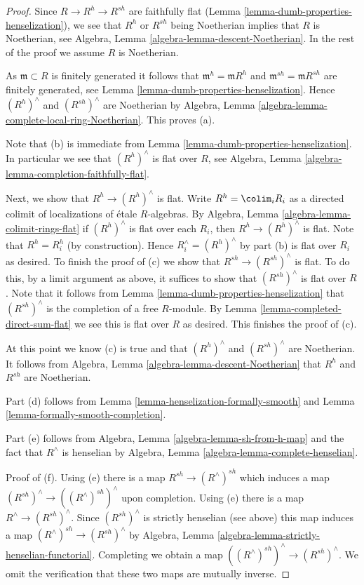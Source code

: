 \begin{proof}
Since $R \to R^h \to R^{sh}$ are faithfully flat
(Lemma \ref{lemma-dumb-properties-henselization}),
we see that $R^h$ or $R^{sh}$ being Noetherian implies that $R$
is Noetherian, see Algebra, Lemma \ref{algebra-lemma-descent-Noetherian}.
In the rest of the proof we assume $R$ is Noetherian.

\medskip\noindent
As $\mathfrak m \subset R$ is finitely generated it follows that
$\mathfrak m^h = \mathfrak m R^h$ and $\mathfrak m^{sh} = \mathfrak mR^{sh}$
are finitely generated, see Lemma \ref{lemma-dumb-properties-henselization}.
Hence $(R^h)^\wedge$ and $(R^{sh})^\wedge$ are Noetherian by
Algebra, Lemma \ref{algebra-lemma-complete-local-ring-Noetherian}.
This proves (a).

\medskip\noindent
Note that (b) is immediate from
Lemma \ref{lemma-dumb-properties-henselization}.
In particular we see that $(R^h)^\wedge$ is flat over $R$, see
Algebra, Lemma \ref{algebra-lemma-completion-faithfully-flat}.

\medskip\noindent
Next, we show that $R^h \to (R^h)^\wedge$ is flat.
Write $R^h = \colim_i R_i$ as a directed colimit of
localizations of \'etale $R$-algebras. By
Algebra, Lemma \ref{algebra-lemma-colimit-rings-flat}
if $(R^h)^\wedge$ is flat over each $R_i$, then $R^h \to (R^h)^\wedge$ is
flat. Note that $R^h = R_i^h$ (by construction).
Hence $R_i^\wedge = (R^h)^\wedge$
by part (b) is flat over $R_i$ as desired. To finish the proof of (c)
we show that $R^{sh} \to (R^{sh})^\wedge$ is flat. To do this, by a
limit argument as above, it suffices to show that $(R^{sh})^\wedge$
is flat over $R$. Note that it follows from
Lemma \ref{lemma-dumb-properties-henselization}
that $(R^{sh})^\wedge$ is the completion of a free $R$-module.
By Lemma \ref{lemma-completed-direct-sum-flat}
we see this is flat over $R$ as desired. This finishes the proof of (c).

\medskip\noindent
At this point we know (c) is true and that $(R^h)^\wedge$ and
$(R^{sh})^\wedge$ are Noetherian. It follows from
Algebra, Lemma \ref{algebra-lemma-descent-Noetherian}
that $R^h$ and $R^{sh}$ are Noetherian.

\medskip\noindent
Part (d) follows from Lemma \ref{lemma-henselization-formally-smooth}
and Lemma \ref{lemma-formally-smooth-completion}.

\medskip\noindent
Part (e) follows from Algebra, Lemma \ref{algebra-lemma-sh-from-h-map}
and the fact that $R^\wedge$ is henselian by
Algebra, Lemma \ref{algebra-lemma-complete-henselian}.

\medskip\noindent
Proof of (f). Using (e) there is a map $R^{sh} \to (R^\wedge)^{sh}$
which induces a map $(R^{sh})^\wedge \to ((R^\wedge)^{sh})^\wedge$
upon completion. Using (e) there is a map $R^\wedge \to (R^{sh})^\wedge$.
Since $(R^{sh})^\wedge$ is strictly henselian (see above) this map
induces a map $(R^\wedge)^{sh} \to (R^{sh})^\wedge$ by
Algebra, Lemma \ref{algebra-lemma-strictly-henselian-functorial}.
Completing we obtain a map $((R^\wedge)^{sh})^\wedge \to (R^{sh})^\wedge$.
We omit the verification that these two maps are mutually inverse.
\end{proof}

